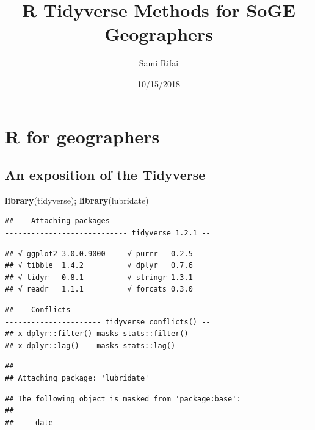 \documentclass[]{article}
\title{R Tidyverse Methods for SoGE Geographers}
\author{Sami Rifai}
\date{10/15/2018}
\newenvironment{Shaded}{\begin{snugshade}}{\end{snugshade}}
\newcommand{\KeywordTok}[1]{\textcolor[rgb]{0.13,0.29,0.53}{\textbf{#1}}}
\newcommand{\NormalTok}[1]{#1}
\begin{document}
\maketitle

\hypertarget{r-for-geographers}{%
\section{\texorpdfstring{\textbf{R for
geographers}}{R for geographers}}\label{r-for-geographers}}

\hypertarget{an-exposition-of-the-tidyverse}{%
\subsection{An exposition of the
Tidyverse}\label{an-exposition-of-the-tidyverse}}

\begin{Shaded}
\begin{Highlighting}[]
\KeywordTok{library}\NormalTok{(tidyverse); }\KeywordTok{library}\NormalTok{(lubridate)}
\end{Highlighting}
\end{Shaded}

\begin{verbatim}
## -- Attaching packages ------------------------------------------------------------------------- tidyverse 1.2.1 --
\end{verbatim}

\begin{verbatim}
## √ ggplot2 3.0.0.9000     √ purrr   0.2.5     
## √ tibble  1.4.2          √ dplyr   0.7.6     
## √ tidyr   0.8.1          √ stringr 1.3.1     
## √ readr   1.1.1          √ forcats 0.3.0
\end{verbatim}

\begin{verbatim}
## -- Conflicts ---------------------------------------------------------------------------- tidyverse_conflicts() --
## x dplyr::filter() masks stats::filter()
## x dplyr::lag()    masks stats::lag()
\end{verbatim}

\begin{verbatim}
## 
## Attaching package: 'lubridate'
\end{verbatim}

\begin{verbatim}
## The following object is masked from 'package:base':
## 
##     date
\end{verbatim}
\end{document}
